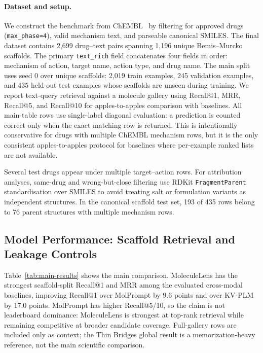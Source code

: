 \documentclass{article}
\begin{document}
\paragraph{Dataset and setup.}
We construct the benchmark from ChEMBL~\citep{gaulton2012chembl,zdrazil2024chembl} by filtering for approved drugs (\texttt{max\_phase=4}), valid mechanism text, and parseable canonical SMILES. The final dataset contains 2,699 drug--text pairs spanning 1,196 unique Bemis--Murcko scaffolds. The primary \texttt{text\_rich} field concatenates four fields in order: mechanism of action, target name, action type, and drug name.
The main split uses seed 0 over unique scaffolds: 2,019 train examples, 245 validation examples, and 435 held-out test examples whose scaffolds are unseen during training. We report text-query retrieval against a molecule gallery using Recall@1, MRR, Recall@5, and Recall@10 for apples-to-apples comparison with baselines. All main-table rows use single-label diagonal evaluation: a prediction is counted correct only when the exact matching row is returned. This is intentionally conservative for drugs with multiple ChEMBL mechanism rows, but it is the only consistent apples-to-apples protocol for baselines where per-example ranked lists are not available.

Several test drugs appear under multiple target--action rows. For attribution analyses, same-drug and wrong-but-close filtering use RDKit \texttt{FragmentParent} standardisation over SMILES to avoid treating salt or formulation variants as independent structures. In the canonical scaffold test set, 193 of 435 rows belong to 76 parent structures with multiple mechanism rows.

\subsection{Model Performance: Scaffold Retrieval and Leakage Controls}
\label{sec:results}

Table~\ref{tab:main-results} shows the main comparison. MoleculeLens has the strongest scaffold-split Recall@1 and MRR among the evaluated cross-modal baselines, improving Recall@1 over MolPrompt by 9.6 points and over KV-PLM by 17.0 points. MolPrompt has higher Recall@5/10, so the claim is not leaderboard dominance: MoleculeLens is strongest at top-rank retrieval while remaining competitive at broader candidate coverage. Full-gallery rows are included only as context; the Thin Bridges global result is a memorization-heavy reference, not the main scientific comparison.
\end{document}
